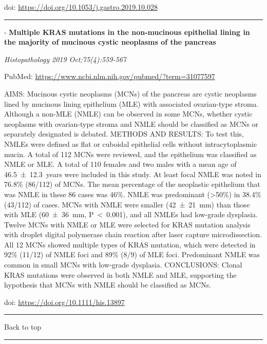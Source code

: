 \documentclass[
]{article}
\renewcommand{\linethickness}{0.05em}
\begin{document}
doi: \url{https://doi.org/10.1053/j.gastro.2019.10.028}

\begin{center}\rule{0.5\linewidth}{\linethickness}\end{center}

- \textbf{Multiple KRAS mutations in the non-mucinous epithelial lining
in the majority of mucinous cystic neoplasms of the pancreas}

\emph{Histopathology 2019 Oct;75(4):559-567}

PubMed: \url{https://www.ncbi.nlm.nih.gov/pubmed/?term=31077597}

AIMS: Mucinous cystic neoplasms (MCNs) of the pancreas are cystic
neoplasms lined by mucinous lining epithelium (MLE) with associated
ovarian-type stroma. Although a non-MLE (NMLE) can be observed in some
MCNs, whether cystic neoplasms with ovarian-type stroma and NMLE should
be classified as MCNs or separately designated is debated. METHODS AND
RESULTS: To test this, NMLEs were defined as flat or cuboidal epithelial
cells without intracytoplasmic mucin. A total of 112 MCNs were reviewed,
and the epithelium was classified as NMLE or MLE. A total of 110 females
and two males with a mean age of 46.5~±~12.3~years were included in this
study. At least focal NMLE was noted in 76.8\% (86/112) of MCNs. The
mean percentage of the neoplastic epithelium that was NMLE in these 86
cases was 46\%. NMLE was predominant (\textgreater50\%) in 38.4\%
(43/112) of cases. MCNs with NMLE were smaller (42~±~21~mm) than those
with MLE (60~±~36~mm, P~\textless~0.001), and all NMLEs had low-grade
dysplasia. Twelve MCNs with NMLE or MLE were selected for KRAS mutation
analysis with droplet digital polymerase chain reaction after laser
capture microdissection. All 12 MCNs showed multiple types of KRAS
mutation, which were detected in 92\% (11/12) of NMLE foci and 89\%
(8/9) of MLE foci. Predominant NMLE was common in small MCNs with
low-grade dysplasia. CONCLUSIONS: Clonal KRAS mutations were observed in
both NMLE and MLE, supporting the hypothesis that MCNs with NMLE should
be classified as MCNs.

doi: \url{https://doi.org/10.1111/his.13897}

\begin{center}\rule{0.5\linewidth}{\linethickness}\end{center}

Back to top

\begin{center}\rule{0.5\linewidth}{\linethickness}\end{center}
\end{document}
